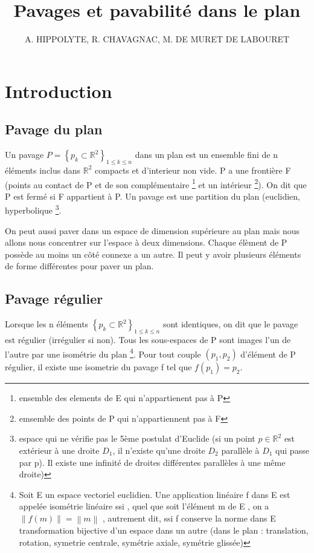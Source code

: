 \documentclass{article}
\title{Pavages et pavabilité dans le plan}
\author{A. HIPPOLYTE, R. CHAVAGNAC, M. DE MURET DE LABOURET}
\begin{document}
\maketitle

\tableofcontents

\newpage

\section{Introduction}

\subsection{Pavage du plan}

Un pavage $P=\left \{ p_{k}\subset \mathbb{R}^{2} \right \}_{1\leq k\leq n}$ dans un plan est un ensemble fini de n éléments inclus dans $\mathbb{R}^{2}$ compacts et d’interieur non vide.
P a une frontière F (points au contact de P et de son complémentaire \footnote{ensemble des elements de E qui n'appartienent pas à P} et un intérieur \footnote{emsemble des points de P qui n'appartiennent pas à F}).
On dit que P est fermé si F appartient à P.
Un pavage est une partition du plan (euclidien, hyperbolique \footnote{ espace qui ne vérifie pas le 5ème postulat d’Euclide (si un point $p\in \mathbb{R}^{2}$ est extérieur à une droite $D_{1}$, il n’existe qu’une droite $D_{2}$ parallèle à $D_{1}$ qui passe par p). Il existe une infinité de droites différentes parallèles à une même droite)}.

On peut aussi paver dans un espace de dimension supérieure au plan mais nous allons nous concentrer sur l’espace à deux dimensions.
Chaque élèment de P possède au moins un côté connexe a un autre.
Il peut y avoir plusieurs éléments de forme différentes pour paver un plan.

\subsection{Pavage régulier}

Lorsque les n éléments $\left \{ p_{k}\subset \mathbb{R}^{2} \right \}_{1\leq k\leq n}$ sont identiques, on dit que le pavage est régulier (irrégulier si non).
Tous les sous-espaces de P sont images l’un de l’autre par une isométrie du plan \footnote{ Soit E un espace vectoriel euclidien. Une application linéaire f dans E est appelée isométrie linéaire ssi , quel que soit l’élément m de E , on a $\left \| f\left ( m \right ) \right \| = \left \| m \right \|$ , autrement dit, ssi f conserve la norme dans E transformation bijective d'un espace dans un autre (dans le plan : translation, rotation, symetrie centrale, symétrie axiale, symétrie glissée)}.
Pour tout couple $\left ( p_{1} ,p_{2}\right )$ d'élément de P régulier, il existe une isometrie du pavage f tel que $f\left (  p_{1}\right )=p_{2}$.
\end{document}
